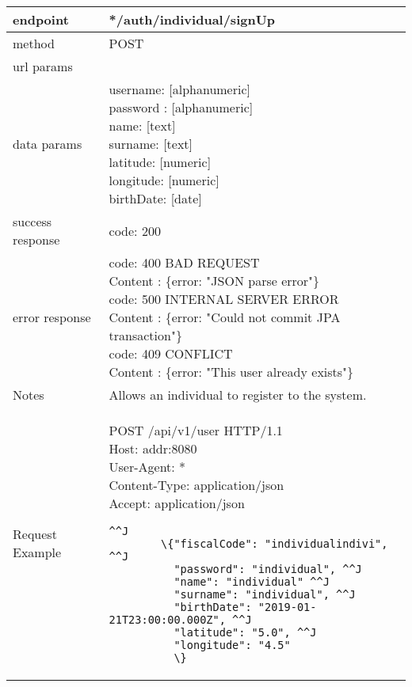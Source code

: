 \begin{tabularx}{\linewidth}{| l| l }
	\hline
	endpoint & */auth/individual/signUp \\
	\hline
	method & POST \\
	\hline
	url params & \\
	\hline
	data params &
	\parbox{0.7\textwidth}{
		\bigskip
		username: [alphanumeric]\\
		password : [alphanumeric]\\
		name: [text]\\
		surname: [text]\\
		latitude: [numeric]\\
		longitude: [numeric]\\
		birthDate: [date]
		\bigskip
	} \\
	\hline
	success response &
	\parbox{0.7\textwidth}{
		\bigskip
		code: 200\\
	} \\
	\hline
	error response &
	\parbox{0.7\textwidth}{
		\bigskip
		code: 400 BAD REQUEST \\
		Content : \{error: "JSON parse error"\}\\
		code: 500 INTERNAL SERVER ERROR \\
		Content : \{error: "Could not commit JPA transaction"\}\\
		code: 409 CONFLICT \\
		Content : \{error: "This user already exists"\}
		\bigskip
	} \\
	\hline
	Notes & 
	\parbox{0.7\textwidth}{
		\bigskip Allows an individual to register to the system.
	\bigskip}  \\
	\hline
	Request Example & 
		\parbox{0.8\textwidth}{
		\bigskip
		POST /api/v1/user HTTP/1.1 \\
		Host: {addr}:8080 \\
		User-Agent: * \\
		Content-Type: application/json \\
		Accept: application/json \\
		\bigskip
		\begin{lstlisting}^^J
		\{"fiscalCode": "individualindivi", ^^J
		  "password": "individual", ^^J
		  "name": "individual" ^^J
		  "surname": "individual", ^^J
		  "birthDate": "2019-01-21T23:00:00.000Z", ^^J
		  "latitude": "5.0", ^^J
		  "longitude": "4.5"
		  \}
		\end{lstlisting}
	} \\
	\hline
\end{tabularx}

